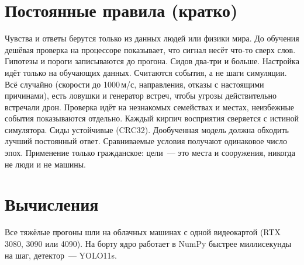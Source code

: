 \documentclass[10pt]{article}
\begin{document}
{\small


}

\appendix
\section{Постоянные правила (кратко)}
Чувства и ответы берутся только из данных людей или физики мира. До обучения дешёвая проверка на процессоре показывает, что
сигнал несёт что-то сверх слов. Гипотезы и пороги записываются до прогона. Сидов два-три и больше. Настройка идёт только на
обучающих данных. Считаются события, а не шаги симуляции. Всё случайно (скорости до 1000\,м/с, направления, отказы с настоящими
причинами), есть ловушки и генератор встреч, чтобы угрозы действительно встречали дрон. Проверка идёт на незнакомых семействах и
местах, неизбежные события показываются отдельно. Каждый кирпич восприятия сверяется с истиной симулятора. Сиды устойчивые
(CRC32). Дообученная модель должна обходить лучший постоянный ответ. Сравниваемые условия получают одинаковое число эпох.
Применение только гражданское: цели~--- это места и сооружения, никогда не люди и не машины.

\section{Вычисления}
Все тяжёлые прогоны шли на облачных машинах с одной видеокартой (RTX 3080, 3090 или 4090). На борту
ядро работает в NumPy быстрее миллисекунды на шаг, детектор~--- YOLO11s.


\end{document}
